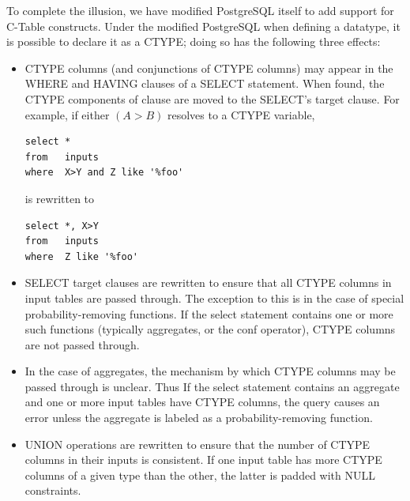 %
%


To complete the illusion, we have modified PostgreSQL itself to add support for C-Table constructs.  Under the modified PostgreSQL when defining a datatype, it is possible to declare it as a CTYPE; doing so has the following three effects:
\begin{itemize}
\item CTYPE columns (and conjunctions of CTYPE columns) may appear in the WHERE and HAVING clauses of a SELECT statement.  When found, the CTYPE components of clause are moved to the SELECT's target clause.  For example, if either $(A>B)$ resolves to a CTYPE variable, 
\begin{verbatim}
select *
from   inputs
where  X>Y and Z like '%foo'
\end{verbatim}
is rewritten to
\begin{verbatim}
select *, X>Y
from   inputs
where  Z like '%foo'
\end{verbatim}

\item SELECT target clauses are rewritten to ensure that all CTYPE columns in input tables are passed through.   The exception to this is in the case of special probability-removing functions.  If the select statement contains one or more such functions (typically aggregates, or the conf operator), CTYPE columns are not passed through.  

\item In the case of aggregates, the mechanism by which CTYPE columns may be passed through is unclear.  Thus If the select statement contains an aggregate and one or more input tables have CTYPE columns, the query causes an error unless the aggregate is labeled as a probability-removing function.

\item UNION operations are rewritten to ensure that the number of CTYPE columns in their inputs is consistent.  If one input table has more CTYPE columns of a given type than the other, the latter is padded with NULL constraints.

\end{itemize}

